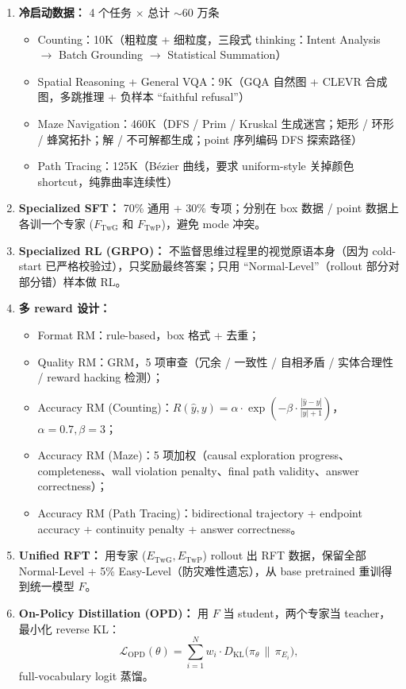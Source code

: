 \begin{enumerate}[leftmargin=1.5em]
  \item \textbf{冷启动数据：} 4 个任务 $\times$ 总计 $\sim$60 万条
  \begin{itemize}[leftmargin=1.5em]
    \item Counting：10K（粗粒度 + 细粒度，三段式 thinking：Intent Analysis $\to$ Batch Grounding $\to$ Statistical Summation）
    \item Spatial Reasoning + General VQA：9K（GQA 自然图 + CLEVR 合成图，多跳推理 + 负样本 ``faithful refusal''）
    \item Maze Navigation：460K（DFS / Prim / Kruskal 生成迷宫；矩形 / 环形 / 蜂窝拓扑；解 / 不可解都生成；point 序列编码 DFS 探索路径）
    \item Path Tracing：125K（Bézier 曲线，要求 uniform-style 关掉颜色 shortcut，纯靠曲率连续性）
  \end{itemize}
  \item \textbf{Specialized SFT：} 70\% 通用 + 30\% 专项；分别在 box 数据 / point 数据上各训一个专家 ($F_\text{TwG}$ 和 $F_\text{TwP}$)，避免 mode 冲突。
  \item \textbf{Specialized RL (GRPO)：} 不监督思维过程里的视觉原语本身（因为 cold-start 已严格校验过），只奖励最终答案；只用 ``Normal-Level''（rollout 部分对部分错）样本做 RL。
  \item \textbf{多 reward 设计：}
  \begin{itemize}[leftmargin=1.5em]
    \item Format RM：rule-based，box 格式 + 去重；
    \item Quality RM：GRM，5 项审查（冗余 / 一致性 / 自相矛盾 / 实体合理性 / reward hacking 检测）；
    \item Accuracy RM (Counting)：$R(\hat y, y) = \alpha \cdot \exp(-\beta \cdot \frac{|\hat y - y|}{|y|+1})$，$\alpha = 0.7, \beta = 3$；
    \item Accuracy RM (Maze)：5 项加权（causal exploration progress、completeness、wall violation penalty、final path validity、answer correctness）；
    \item Accuracy RM (Path Tracing)：bidirectional trajectory + endpoint accuracy + continuity penalty + answer correctness。
  \end{itemize}
  \item \textbf{Unified RFT：} 用专家 ($E_\text{TwG}, E_\text{TwP}$) rollout 出 RFT 数据，保留全部 Normal-Level + 5\% Easy-Level（防灾难性遗忘），从 base pretrained 重训得到统一模型 $F$。
  \item \textbf{On-Policy Distillation (OPD)：} 用 $F$ 当 student，两个专家当 teacher，最小化 reverse KL：
    \[ \mathcal{L}_\text{OPD}(\theta) = \sum_{i=1}^{N} w_i \cdot D_\text{KL}\big(\pi_\theta \,\|\, \pi_{E_i}\big), \]
    full-vocabulary logit 蒸馏。
\end{enumerate}

